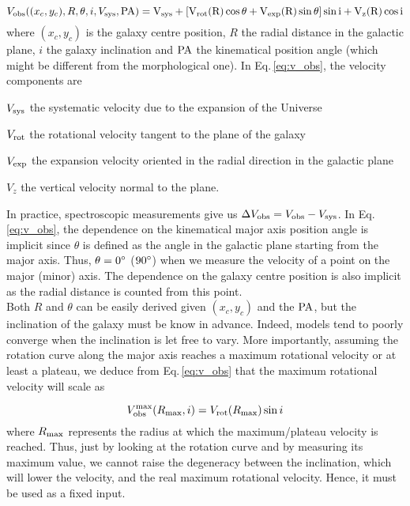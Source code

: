 \begin{equation}
	V_{\rm{obs}} ( (x_c , y_c) , R, \theta , i, V_{\rm{sys}} , \rm{PA} ) = V_{\rm{sys}} + \left [ V_{\rm{rot}} (R) \cos \theta + V_{\rm{exp}} (R) \sin \theta \right ] \sin i + V_z (R) \cos i
	\label{eq:v_obs}
\end{equation}
where $(x_c , y_c)$ is the galaxy centre position, $R$ the radial distance in the galactic plane, $i$ the galaxy inclination and $\rm{PA}$ the kinematical position angle (which might be different from the morphological one). In Eq.\,\ref{eq:v_obs}, the velocity components are
\begin{enumerate*}[label={(\alph*)}]
	\item $V_{\rm{sys}}$ the systematic velocity due to the expansion of the Universe
	\item $V_{\rm{rot}}$ the rotational velocity tangent to the plane of the galaxy
	\item $V_{\rm{exp}}$ the expansion velocity oriented in the radial direction in the galactic plane
	\item $V_z$ the vertical velocity normal to the plane.
\end{enumerate*}

In practice, spectroscopic measurements give us $\Delta V_{\rm{obs}} = V_{\rm{obs}} - V_{\rm{sys}}$. In Eq.\,\ref{eq:v_obs}, the dependence on the kinematical major axis position angle is implicit since $\theta$ is defined as the angle in the galactic plane starting from the major axis. Thus, $\theta = 0 \degree$ ($90 \degree$) when we measure the velocity of a point on the major (minor) axis. The dependence on the galaxy centre position is also implicit as the radial distance is counted from this point. \\

Both $R$ and $\theta$  can be easily derived given $(x_c , y_c)$ and the $\rm{PA}$, but the inclination of the galaxy must be know in advance. Indeed, models tend to poorly converge when the inclination is let free to vary. More importantly, assuming the rotation curve along the major axis reaches a maximum rotational velocity or at least a plateau, we deduce from Eq.\,\ref{eq:v_obs} that the maximum rotational velocity will scale as

\begin{equation}
	V_{\rm{obs}}^{\rm{max}} (R_{\rm{max}}, i) = V_{\rm{rot}} (R_{\rm{max}}) \sin i
\end{equation}
where $R_{\rm{max}}$ represents the radius at which the maximum/plateau velocity is reached. Thus, just by looking at the rotation curve and by measuring its maximum value, we cannot raise the degeneracy between the inclination, which will lower the velocity, and the real maximum rotational velocity. Hence, it must be used as a fixed input.


